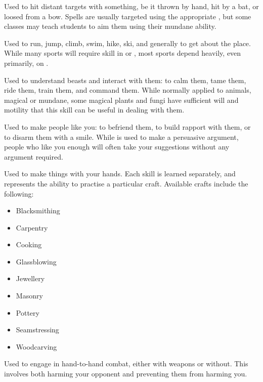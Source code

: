 
Used to hit distant targets with something, be it thrown by hand, hit by a bat, or loosed from a bow.
Spells are usually targeted using the appropriate {\magicskill}, but some classes may teach students to aim them using their mundane ability. %


Used to run, jump, climb, swim, hike, ski, and generally to get about the place.
While many sports will require skill in  or , most sports depend heavily, even primarily, on .


Used to understand beasts and interact with them: to calm them, tame them, ride them, train them, and command them.
While normally applied to animals, magical or mundane, some magical plants and fungi have sufficient will and motility that this skill can be useful in dealing with them.


Used to make people like you: to befriend them, to build rapport with them, or to disarm them with a smile.
While  is used to make a persuasive argument, people who like you enough will often take your suggestions without any argument required.


Used to make things with your hands.
Each  skill is learned separately, and represents the ability to practise a particular craft.
Available crafts include the following:
\begin{itemize}
	\item Blacksmithing
	\item Carpentry
	\item Cooking
	\item Glassblowing
	\item Jewellery
	\item Masonry
	\item Pottery
	\item Seamstressing
	\item Woodcarving
\end{itemize}


Used to engage in hand-to-hand combat, either with weapons or without.
This involves both harming your opponent and preventing them from harming you.

